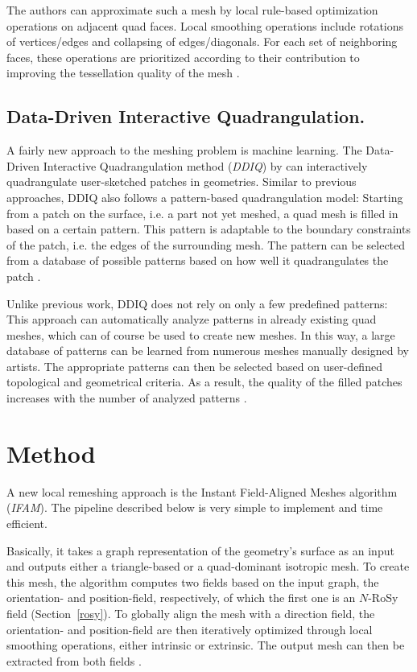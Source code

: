 \documentclass{ACGSeminar}
\begin{document}
The authors can approximate such a mesh by local rule-based optimization operations on adjacent quad faces. Local smoothing operations include rotations of vertices/edges and collapsing of edges/diagonals. For each set of neighboring faces, these operations are prioritized according to their contribution to improving the tessellation quality of the mesh \cite{tarini2010practical}.

\subsection*{Data-Driven Interactive Quadrangulation.}\label{DDIQ}
A fairly new approach to the meshing problem is machine learning. The Data-Driven Interactive Quadrangulation method (\textit{DDIQ}) by \cite{marcias2015data} can interactively quadrangulate user-sketched patches in geometries. Similar to previous approaches, DDIQ also follows a pattern-based quadrangulation model: Starting from a patch on the surface, i.e. a part not yet meshed, a quad mesh is filled in based on a certain pattern. This pattern is adaptable to the boundary constraints of the patch, i.e. the edges of the surrounding mesh. The pattern can be selected from a database of possible patterns based on how well it quadrangulates the patch \cite{marcias2015data}.

Unlike previous work, DDIQ does not rely on only a few predefined patterns: This approach can automatically analyze patterns in already existing quad meshes, which can of course be used to create new meshes. In this way, a large database of patterns can be learned from numerous meshes manually designed by artists. The appropriate patterns can then be selected based on user-defined topological and geometrical criteria. As a result, the quality of the filled patches increases with the number of analyzed patterns \cite{marcias2015data}.


\section{Method}\label{algorithm}
A new local remeshing approach is the Instant Field-Aligned Meshes algorithm (\textit{IFAM}). The pipeline described below is very simple to implement and time efficient.

Basically, it takes a graph representation of the geometry's surface as an input and outputs either a triangle-based or a quad-dominant isotropic mesh. To create this mesh, the algorithm computes two fields based on the input graph, the orientation- and position-field, respectively, of which the first one is an $N$-RoSy field (Section~\ref{rosy}). To globally align the mesh with a direction field, the orientation- and position-field are then iteratively optimized through local smoothing operations, either intrinsic or extrinsic. The output mesh can then be extracted from both fields \cite{jakob2015instant}.
\end{document}
